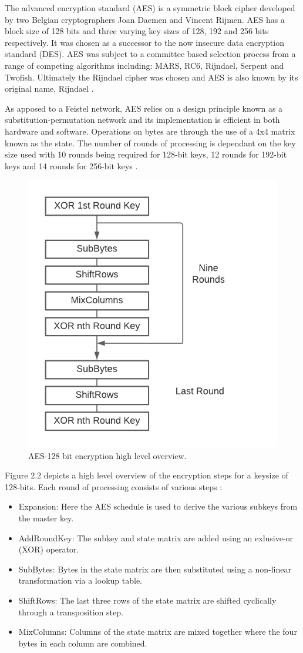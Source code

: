 The advanced encryption standard (AES) is a symmetric block cipher developed by two Belgian cryptographers Joan Daemen and Vincent Rijmen. AES has a block size of 128 bits and three varying key sizes of 128, 192 and 256 bits respectively. It was chosen as a successor to the now insecure data encryption standard (DES). AES was subject to a committee based selection process from a range of competing algorithms including: MARS, RC6, Rijndael, Serpent and Twofish. Ultimately the Rijndael cipher was chosen and AES is also known by its original name, Rijndael \cite{encryption_standards}.

As apposed to a Feistel network, AES relies on a design principle known as a substitution-permutation network and its implementation is efficient in both hardware and software. Operations on bytes are through the use of a 4x4 matrix known as the state. The number of rounds of processing is dependant on the key size used with 10 rounds being required for 128-bit keys, 12 rounds for 192-bit keys and 14 rounds for 256-bit keys \cite{aes}.

\begin{figure}[H]
\centering
\includegraphics[width=0.5\columnwidth]{Figures/Fig_64.png}
\caption{AES-128 bit encryption high level overview.}
\label{fig:gantt}
\end{figure}

Figure 2.2 depicts a high level overview of the encryption steps for a keysize of 128-bits. Each round of processing consists of various steps \cite{aes}:
\begin{itemize}
  \item Expansion: Here the AES schedule is used to derive the various subkeys from the master key.
  \item AddRoundKey: The subkey and state matrix are added using an exlusive-or (XOR) operator.
  \item SubBytes: Bytes in the state matrix are then substituted using a non-linear transformation via a lookup table. 
   \item ShiftRows: The last three rows of the state matrix are shifted cyclically through a transposition step.
   \item MixColumns: Columns of the state matrix are mixed together where the four bytes in each column are combined.
  \end{itemize}

